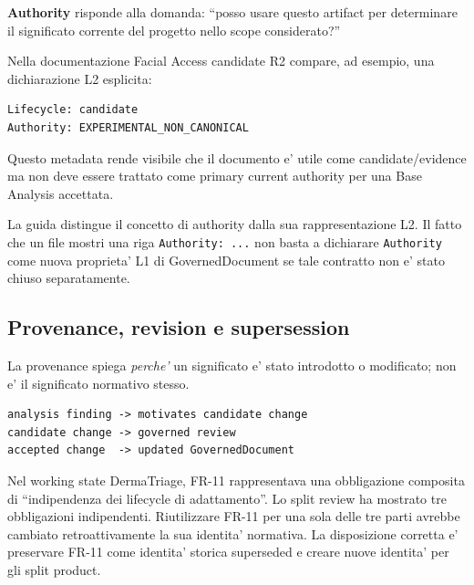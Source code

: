 \documentclass[11pt,a4paper]{article}
\begin{document}
\textbf{Authority} risponde alla domanda: ``posso usare questo artifact per determinare il significato corrente del progetto nello scope considerato?''

Nella documentazione Facial Access candidate R2 compare, ad esempio, una dichiarazione L2 esplicita:

\begin{lstlisting}
Lifecycle: candidate
Authority: EXPERIMENTAL_NON_CANONICAL
\end{lstlisting}

Questo metadata rende visibile che il documento e' utile come candidate/evidence ma non deve essere trattato come primary current authority per una Base Analysis accettata.

\begin{ddtaworking}[title={Authority come governance, non nuovo campo L1 introdotto dalla guida}]
La guida distingue il concetto di authority dalla sua rappresentazione L2. Il fatto che un file mostri una riga \texttt{Authority: ...} non basta a dichiarare \texttt{Authority} come nuova proprieta' L1 di GovernedDocument se tale contratto non e' stato chiuso separatamente.
\end{ddtaworking}

\subsection{Provenance, revision e supersession}

La provenance spiega \emph{perche'} un significato e' stato introdotto o modificato; non e' il significato normativo stesso.

\begin{lstlisting}
analysis finding -> motivates candidate change
candidate change -> governed review
accepted change  -> updated GovernedDocument
\end{lstlisting}

\begin{ddtaexample}[title={A6 - perche' non riciclare silenziosamente un ID}]
Nel working state DermaTriage, FR-11 rappresentava una obbligazione composita di ``indipendenza dei lifecycle di adattamento''. Lo split review ha mostrato tre obbligazioni indipendenti. Riutilizzare FR-11 per una sola delle tre parti avrebbe cambiato retroattivamente la sua identita' normativa. La disposizione corretta e' preservare FR-11 come identita' storica superseded e creare nuove identita' per gli split product.
\end{ddtaexample}
\end{document}
